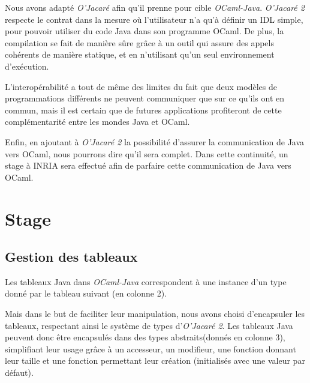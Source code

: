 \documentclass[a4paper, 11pt]{article}
\begin{document}
Nous avons adapté \emph{O'Jacaré} afin qu'il prenne pour cible
\emph{OCaml-Java}.  \emph{O'Jacaré 2} respecte le contrat dans la
mesure où l'utilisateur n'a qu'à définir un IDL simple, pour pouvoir
utiliser du code Java dans son programme OCaml.  De plus, la
compilation se fait de manière sûre grâce à un outil qui assure des
appels cohérents de manière statique, et en n'utilisant qu'un seul environnement d'exécution.

L'interopérabilité a tout de même des limites du fait que deux modèles
de programmations différents ne peuvent communiquer que sur ce qu'ils
ont en commun, mais il est certain que de futures applications
profiteront de cette complémentarité entre les mondes Java et OCaml.

Enfin, en ajoutant à \emph{O'Jacaré 2} la possibilité d'assurer la
communication de Java vers OCaml, nous pourrons dire qu'il
sera complet. Dans cette continuité, un stage à INRIA sera effectué afin de parfaire cette communication de Java vers OCaml.








\newpage
\section{Stage}

\subsection{Gestion des tableaux}
Les tableaux Java dans \emph{OCaml-Java} correspondent à une instance d'un type donné par le tableau suivant (en colonne 2).

Mais dans le but de faciliter leur manipulation, nous avons choisi d'encapsuler les tableaux, respectant ainsi le système de types d'\emph{O'Jacaré 2}.
Les tableaux Java peuvent donc être encapsulés dans des types abstraits(donnés en colonne 3), simplifiant leur usage grâce à un accesseur, un modifieur, une fonction donnant leur taille et une fonction permettant leur création (initialisés avec une valeur par défaut).
\newline
\end{document}
